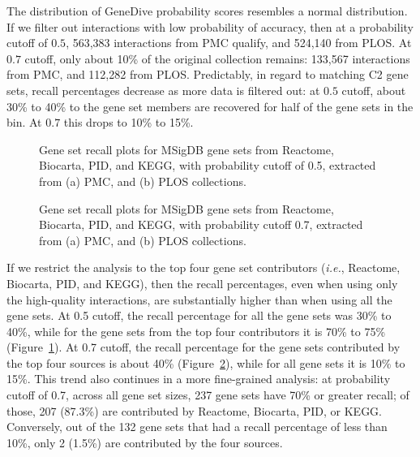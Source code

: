 \documentclass{ws-procs11x85}
\begin{document}
The distribution of GeneDive probability scores resembles a normal distribution. If we filter out interactions with low probability of accuracy, then at a probability cutoff of $0.5$, 563,383 interactions from PMC qualify, and 524,140 from PLOS.  At $0.7$ cutoff, only about 10\% of the original collection remains: 133,567 interactions from PMC, and 112,282 from PLOS. Predictably, in regard to matching C2 gene sets, recall percentages decrease as more data is filtered out: at $0.5$ cutoff, about 30\% to 40\% to the gene set members are recovered for half of the gene sets in the bin. At $0.7$ this drops to 10\% to 15\%.


\begin{figure}
\centering
{}\quad
{}
\caption{Gene set recall plots for MSigDB gene sets from Reactome, Biocarta, PID, and KEGG, with probability cutoff of 0.5, extracted from (a) PMC, and (b) PLOS collections.}
\label{fig:big3_05cutoff}
\end{figure}

\begin{figure}
\centering
{}\quad
{}
\caption{Gene set recall plots for MSigDB gene sets from Reactome, Biocarta, PID, and KEGG, with probability cutoff 0.7, extracted from (a) PMC, and (b) PLOS collections.}
\label{fig:big3_07cutoff}
\end{figure}



If we restrict the analysis to the top four gene set contributors (\textit{i.e.}, Reactome, Biocarta, PID, and KEGG), then the recall percentages, even when using only the high-quality interactions, are substantially higher than when using all the gene sets.  At 0.5 cutoff, the recall percentage for all the gene sets was 30\% to 40\%, while for the gene sets from the top four contributors it is 70\% to 75\% (Figure~\ref{fig:big3_05cutoff}).  At 0.7 cutoff, the recall percentage for the gene sets contributed by the top four sources is about 40\% (Figure~\ref{fig:big3_07cutoff}), while for all gene sets it is 10\% to 15\%. This trend also continues in a more fine-grained analysis: at probability cutoff of 0.7, across all gene set sizes, 237 gene sets have 70\% or greater recall; of those, 207 (87.3\%) are contributed by Reactome, Biocarta, PID, or KEGG.  Conversely, out of the 132 gene sets that had a recall percentage of less than 10\%, only 2 (1.5\%) are contributed by the four sources.     
\end{document}
